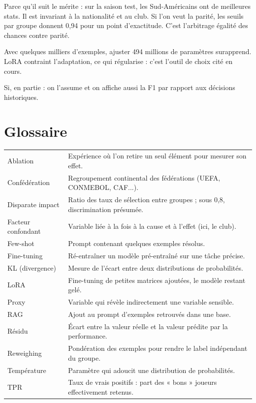 \documentclass[11pt,a4paper]{article}
\begin{document}
\begin{description}[style=nextline,leftmargin=0pt,itemsep=6pt]
  Parce qu'il suit le mérite : sur la saison test, les Sud-Américains ont de meilleures stats. Il est invariant à la nationalité et au club. Si l'on veut la parité, les seuils par groupe donnent 0,94 pour un point d'exactitude. C'est l'arbitrage égalité des chances contre parité.
  \item[Pourquoi LoRA bat le fine-tuning complet ?]
  Avec quelques milliers d'exemples, ajuster 494 millions de paramètres surapprend. LoRA contraint l'adaptation, ce qui régularise : c'est l'outil de choix cité en cours.
  \item[Votre évaluation n'est-elle pas biaisée en faveur des modèles corrigés ?]
  Si, en partie : on l'assume et on affiche aussi la F1 par rapport aux décisions historiques.
\end{description}

\section{Glossaire}
\begin{tabularx}{\linewidth}{@{}l X@{}}
\toprule
Ablation & Expérience où l'on retire un seul élément pour mesurer son effet. \\
Confédération & Regroupement continental des fédérations (UEFA, CONMEBOL, CAF...). \\
Disparate impact & Ratio des taux de sélection entre groupes ; sous 0,8, discrimination présumée. \\
Facteur confondant & Variable liée à la fois à la cause et à l'effet (ici, le club). \\
Few-shot & Prompt contenant quelques exemples résolus. \\
Fine-tuning & Ré-entraîner un modèle pré-entraîné sur une tâche précise. \\
KL (divergence) & Mesure de l'écart entre deux distributions de probabilités. \\
LoRA & Fine-tuning de petites matrices ajoutées, le modèle restant gelé. \\
Proxy & Variable qui révèle indirectement une variable sensible. \\
RAG & Ajout au prompt d'exemples retrouvés dans une base. \\
Résidu & Écart entre la valeur réelle et la valeur prédite par la performance. \\
Reweighing & Pondération des exemples pour rendre le label indépendant du groupe. \\
Température & Paramètre qui adoucit une distribution de probabilités. \\
TPR & Taux de vrais positifs : part des « bons » joueurs effectivement retenus. \\
\bottomrule
\end{tabularx}
\end{document}
